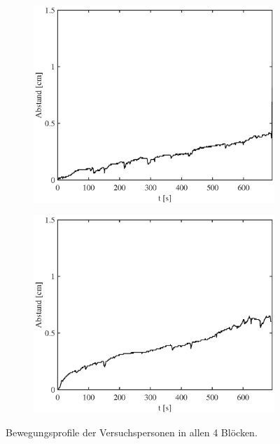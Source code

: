 \documentclass[doc,a4paper,12pt]{apa6}
\begin{document}
\begin{figure}
\begin{subfigure}[c]{0.23\textwidth}
    \label{img:bewegung:pa10:3}
  \end{subfigure}\hspace*{0.02\textwidth}
  \begin{subfigure}[c]{0.23\textwidth}
    \includegraphics[width=\textwidth]{ergebnisse/pa10/pa10a4_mc_dist_movement.eps}
    \label{img:bewegung:pa10:4}
  \end{subfigure}\hspace*{0.02\textwidth}
  \begin{subfigure}[c]{0.23\textwidth}
    \includegraphics[width=\textwidth]{ergebnisse/pa10/pa10a6_mc_dist_movement.eps}
    \label{img:bewegung:pa10:6}
  \end{subfigure}
  \captionsetup{justification=justified}
  \vspace*{3mm}
  \caption[Bewegungsprofile der Versuchspersonen]{Bewegungsprofile der Versuchspersonen in allen 4 Blöcken.}
  \label{img:bewegung}
\end{figure}
\end{document}
